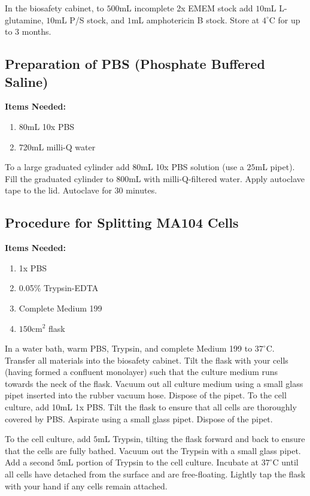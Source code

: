 In the biosafety cabinet, to $500$mL incomplete 2x EMEM stock add $10$mL \textsc{L}-glutamine, $10$mL P/S stock, and $1$mL amphotericin B stock. Store at $4^{\circ}$C for up to 3 months.

\subsection{Preparation of PBS (Phosphate Buffered Saline)}

{\bfseries Items Needed:} \begin{enumerate}
	\item 80mL 10x PBS
	\item 720mL milli-Q water
\end{enumerate}

To a large graduated cylinder add $80$mL 10x PBS solution (use a $25$mL pipet). Fill the graduated cylinder to $800$mL with milli-Q-filtered water. Apply autoclave tape to the lid. Autoclave for 30 minutes.

\subsection{Procedure for Splitting MA104 Cells}

{\bfseries Items Needed:} \begin{enumerate}
	\item 1x PBS
	\item 0.05\% Trypsin-EDTA
	\item Complete Medium 199
	\item $150$cm$^2$ flask
\end{enumerate}

In a water bath, warm PBS, Trypsin, and complete Medium 199 to $37^{\circ}$C. Transfer all materials into the biosafety cabinet. Tilt the flask with your cells (having formed a confluent monolayer) such that the culture medium runs towards the neck of the flask. Vacuum out all culture medium using a small glass pipet inserted into the rubber vacuum hose. Dispose of the pipet. To the cell culture, add 10mL 1x PBS. Tilt the flask to ensure that all cells are thoroughly covered by PBS. Aspirate using a small glass pipet. Dispose of the pipet.

To the cell culture, add $5$mL Trypsin, tilting the flask forward and back to ensure that the cells are fully bathed. Vacuum out the Trypsin with a small glass pipet. Add a second $5$mL portion of Trypsin to the cell culture. Incubate at $37^{\circ}$C until all cells have detached from the surface and are free-floating. Lightly tap the flask with your hand if any cells remain attached.

